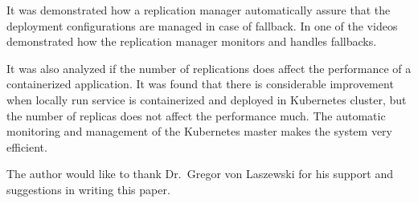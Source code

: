 It was demonstrated how a replication manager automatically assure that the
deployment configurations are managed in case of fallback. In one of the
videos demonstrated how the replication manager monitors and handles
fallbacks.

It was also analyzed if the number of replications does affect the performance
of a containerized application. It was found that there is considerable
improvement when locally run service is containerized and deployed in
Kubernetes cluster, but the number of replicas does not affect the performance
much. The automatic monitoring and management of the Kubernetes master makes
the system very efficient.
\begin{acks}
The author would like to thank Dr.\ Gregor von Laszewski for his support and
suggestions in writing this paper.
\end{acks}





